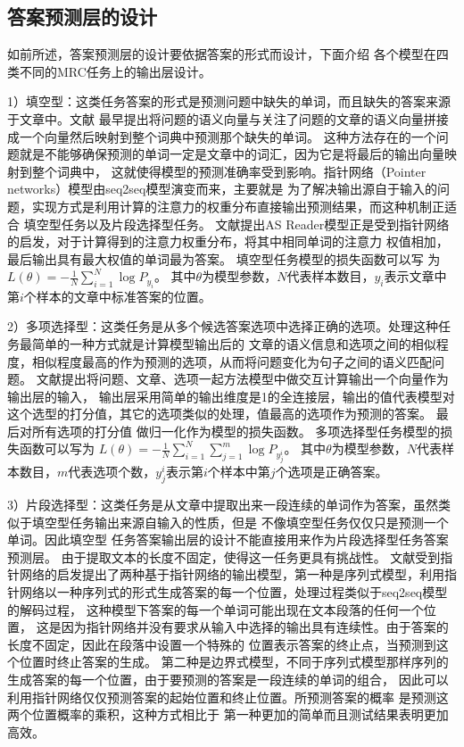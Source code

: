 \subsection{答案预测层的设计}
如前所述，答案预测层的设计要依据答案的形式而设计，下面介绍
各个模型在四类不同的MRC任务上的输出层设计。

1）填空型：这类任务答案的形式是预测问题中缺失的单词，而且缺失的答案来源于文章中。文献\cite{Teaching Machines to Read and Comprehend}
最早提出将问题的语义向量与关注了问题的文章的语义向量拼接成一个向量然后映射到整个词典中预测那个缺失的单词。
这种方法存在的一个问题就是不能够确保预测的单词一定是文章中的词汇，因为它是将最后的输出向量映射到整个词典中，
这就使得模型的预测准确率受到影响。指针网络（Pointer networks）模型由seq2seq模型演变而来，主要就是
为了解决输出源自于输入的问题，实现方式是利用计算的注意力的权重分布直接输出预测结果，而这种机制正适合
填空型任务以及片段选择型任务。
文献\cite{as}提出AS Reader模型正是受到指针网络的启发，对于计算得到的注意力权重分布，将其中相同单词的注意力
权值相加，最后输出具有最大权值的单词最为答案。
填空型任务模型的损失函数可以写
为$L(\theta)=-\displaystyle\frac{1}{N}\sum_{i=1}^{N}\log P_{y_i}$。
其中$\theta$为模型参数，$N$代表样本数目，$y_i$表示文章中第$i$个样本的文章中标准答案的位置。

2）多项选择型：这类任务是从多个候选答案选项中选择正确的选项。处理这种任务最简单的一种方式就是计算模型输出后的
文章的语义信息和选项之间的相似程度，相似程度最高的作为预测的选项，从而将问题变化为句子之间的语义匹配问题。
文献\cite{Co-matching}提出将问题、文章、选项一起方法模型中做交互计算输出一个向量作为输出层的输入，
输出层采用简单的输出维度是1的全连接层，输出的值代表模型对这个选型的打分值，其它的选项类似的处理，值最高的选项作为预测的答案。
最后对所有选项的打分值
做归一化作为模型的损失函数。
多项选择型任务模型的损失函数可以写为
$L(\theta)=-\displaystyle\frac{1}{N}\sum_{i=1}^{N}\sum_{j=1}^{m}\log P_{y_{j}^i}$。
其中$\theta$为模型参数，$N$代表样本数目，$m$代表选项个数，$y_{j}^i$表示第$i$个样本中第$j$个选项是正确答案。

3）片段选择型：这类任务是从文章中提取出来一段连续的单词作为答案，虽然类似于填空型任务输出来源自输入的性质，但是
不像填空型任务仅仅只是预测一个单词。因此填空型
任务答案输出层的设计不能直接用来作为片段选择型任务答案预测层。
由于提取文本的长度不固定，使得这一任务更具有挑战性。
文献\cite{MatchLSTM}受到指针网络的启发提出了两种基于指针网络的输出模型，第一种是序列式模型，利用指针网络以一种序列式的形式生成答案的每一个位置，处理过程类似于seq2seq模型的解码过程，
这种模型下答案的每一个单词可能出现在文本段落的任何一个位置，
这是因为指针网络并没有要求从输入中选择的输出具有连续性。由于答案的长度不固定，因此在段落中设置一个特殊的
位置表示答案的终止点，当预测到这个位置时终止答案的生成。
第二种是边界式模型，不同于序列式模型那样序列的生成答案的每一个位置，由于要预测的答案是一段连续的单词的组合，
因此可以利用指针网络仅仅预测答案的起始位置和终止位置。所预测答案的概率
是预测这两个位置概率的乘积，这种方式相比于
第一种更加的简单而且测试结果表明更加高效。

